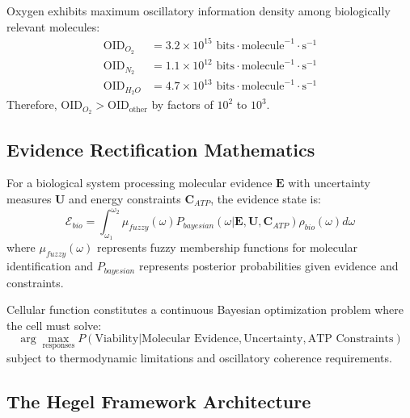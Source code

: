 \documentclass[11pt,a4paper]{article}
\begin{document}
\begin{theorem}
Oxygen exhibits maximum oscillatory information density among biologically relevant molecules:
\begin{align}
\text{OID}_{O_2} &= 3.2 \times 10^{15} \text{ bits} \cdot \text{molecule}^{-1} \cdot \text{s}^{-1} \\
\text{OID}_{N_2} &= 1.1 \times 10^{12} \text{ bits} \cdot \text{molecule}^{-1} \cdot \text{s}^{-1} \\
\text{OID}_{H_2O} &= 4.7 \times 10^{13} \text{ bits} \cdot \text{molecule}^{-1} \cdot \text{s}^{-1}
\end{align}
Therefore, $\text{OID}_{O_2} > \text{OID}_{\text{other}}$ by factors of $10^2$ to $10^3$.
\end{theorem}

\subsection{Evidence Rectification Mathematics}

\begin{definition}
For a biological system processing molecular evidence $\mathbf{E}$ with uncertainty measures $\mathbf{U}$ and energy constraints $\mathbf{C}_{ATP}$, the evidence state is:
\begin{equation}
\mathcal{E}_{bio} = \int_{\omega_1}^{\omega_2} \mu_{fuzzy}(\omega) P_{bayesian}(\omega | \mathbf{E}, \mathbf{U}, \mathbf{C}_{ATP}) \rho_{bio}(\omega) d\omega
\end{equation}
where $\mu_{fuzzy}(\omega)$ represents fuzzy membership functions for molecular identification and $P_{bayesian}$ represents posterior probabilities given evidence and constraints.
\end{definition}

\begin{theorem}
Cellular function constitutes a continuous Bayesian optimization problem where the cell must solve:
\begin{equation}
\arg\max_{\text{responses}} P(\text{Viability} | \text{Molecular Evidence}, \text{Uncertainty}, \text{ATP Constraints})
\end{equation}
subject to thermodynamic limitations and oscillatory coherence requirements.
\end{theorem}

\subsection{The Hegel Framework Architecture}
\end{document}

